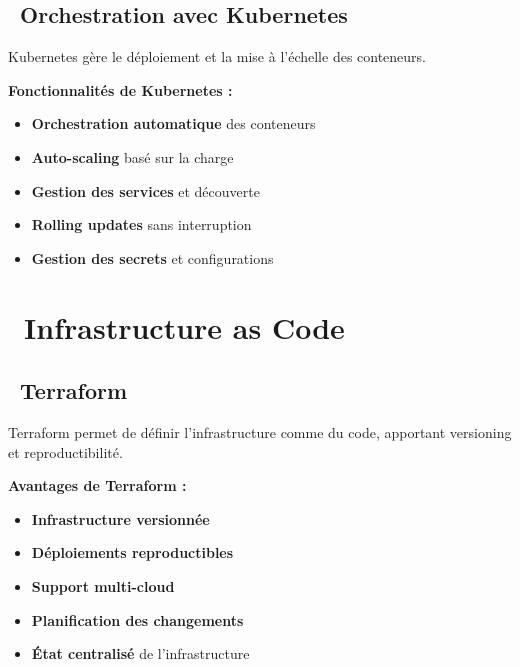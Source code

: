 \subsection{\faNetworkWired\ Orchestration avec Kubernetes}

Kubernetes gère le déploiement et la mise à l'échelle des conteneurs.

\textbf{\color{primaryblue}Fonctionnalités de Kubernetes :}
\begin{itemize}
    \item \textcolor{primaryblue}{\textbf{Orchestration automatique}} des conteneurs
    \item \textcolor{primaryblue}{\textbf{Auto-scaling}} basé sur la charge
    \item \textcolor{primaryblue}{\textbf{Gestion des services}} et découverte
    \item \textcolor{primaryblue}{\textbf{Rolling updates}} sans interruption
    \item \textcolor{primaryblue}{\textbf{Gestion des secrets}} et configurations
\end{itemize}

\section{\faTools\ Infrastructure as Code}

\subsection{\faTools\ Terraform}

\begin{infobox}
Terraform permet de définir l'infrastructure comme du code, apportant versioning et reproductibilité.
\end{infobox}

\textbf{\color{primaryblue}Avantages de Terraform :}
\begin{itemize}
    \item \textcolor{accentgreen}{\textbf{Infrastructure versionnée}}
    \item \textcolor{accentgreen}{\textbf{Déploiements reproductibles}}
    \item \textcolor{accentgreen}{\textbf{Support multi-cloud}}
    \item \textcolor{accentgreen}{\textbf{Planification des changements}}
    \item \textcolor{accentgreen}{\textbf{État centralisé}} de l'infrastructure
\end{itemize}

